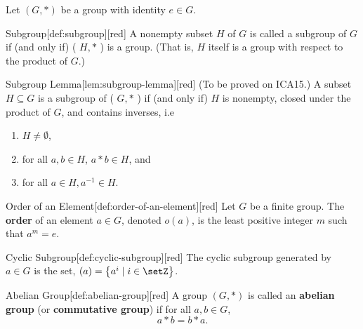 Let $(G, *)$ be a group with identity $e \in G$.
\begin{define}{Subgroup}[def:subgroup][red]
  A nonempty subset $H$ of $G$ is called a subgroup of $G$ if (and only if) ( $H, *$ ) is a group. (That is, $H$ itself is a group with respect to the product of $G$.)
\end{define}
\begin{define}{Subgroup Lemma}[lem:subgroup-lemma][red]
  (To be proved on ICA15.) A subset $H \subseteq G$ is a subgroup of ( $G, *$ ) if (and only if) 
  $H$ is nonempty, closed under the product of $G$, and contains inverses, i.e 
  \begin{enumerate}
    \item $H \neq \emptyset$,
    \item for all $a, b \in H$, $a * b \in H$, and
    \item for all $a \in H, a^{-1} \in H$.
  \end{enumerate}
\end{define}
\begin{define}{Order of an Element}[def:order-of-an-element][red]
  Let $G$ be a finite group. The \textbf{order} of an 
  element $a \in G$, denoted $o(a)$, is the least positive 
  integer $m$ such that $a^m=e$.
\end{define}
\begin{define}{Cyclic Subgroup}[def:cyclic-subgroup][red]
  The cyclic subgroup generated by $a \in G$ is the 
  set, $\left(a\right)=\left\{a^i \mid i \in \setZ\right\}$.
\end{define}
\begin{define}{Abelian Group}[def:abelian-group][red]
  A group $(G, *)$ is called an \textbf{abelian group} (or \textbf{commutative group}) if for all $a, b \in G$, 
  \[
    a * b = b * a.
  \]
\end{define}
\newpage
